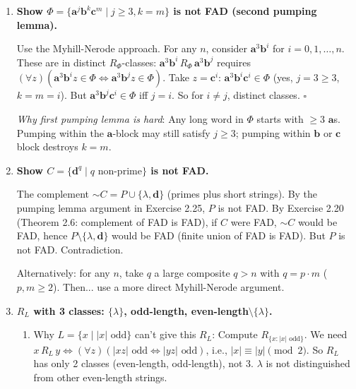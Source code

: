 \begin{enumerate}[{2.}1.]
\item \textbf{Show $\Phi=\{\mathbf{a}^j\mathbf{b}^k\mathbf{c}^m\mid j\geq 3,k=m\}$ is not FAD (second pumping lemma).}

Use the Myhill-Nerode approach. For any $n$, consider $\mathbf{a}^3\mathbf{b}^i$ for $i=0,1,\ldots,n$. These are in distinct $R_\Phi$-classes: $\mathbf{a}^3\mathbf{b}^i\,R_\Phi\,\mathbf{a}^3\mathbf{b}^j$ requires $(\forall z)(\mathbf{a}^3\mathbf{b}^iz\in\Phi\Leftrightarrow\mathbf{a}^3\mathbf{b}^jz\in\Phi)$. Take $z=\mathbf{c}^i$: $\mathbf{a}^3\mathbf{b}^i\mathbf{c}^i\in\Phi$ (yes, $j=3\geq 3$, $k=m=i$). But $\mathbf{a}^3\mathbf{b}^j\mathbf{c}^i\in\Phi$ iff $j=i$. So for $i\neq j$, distinct classes. $\square$

\textit{Why first pumping lemma is hard}: Any long word in $\Phi$ starts with $\geq 3$ $\mathbf{a}$s. Pumping within the $\mathbf{a}$-block may still satisfy $j\geq 3$; pumping within $\mathbf{b}$ or $\mathbf{c}$ block destroys $k=m$.

\item \textbf{Show $C=\{\mathbf{d}^q\mid q\text{ non-prime}\}$ is not FAD.}

The complement $\sim C=P\cup\{\lambda,\mathbf{d}\}$ (primes plus short strings). By the pumping lemma argument in Exercise 2.25, $P$ is not FAD. By Exercise 2.20 (Theorem 2.6: complement of FAD is FAD), if $C$ were FAD, $\sim C$ would be FAD, hence $P\setminus\{\lambda,\mathbf{d}\}$ would be FAD (finite union of FAD is FAD). But $P$ is not FAD. Contradiction.

Alternatively: for any $n$, take $q$ a large composite $q>n$ with $q=p\cdot m$ ($p,m\geq 2$). Then... use a more direct Myhill-Nerode argument.

\item \textbf{$R_L$ with 3 classes: $\{\lambda\}$, odd-length, even-length$\setminus\{\lambda\}$.}

\begin{enumerate}
\item Why $L=\{x\mid|x|\text{ odd}\}$ can't give this $R_L$: Compute $R_{\{x:|x|\text{ odd}\}}$. We need $x\,R_L\,y\Leftrightarrow(\forall z)(|xz|\text{ odd}\Leftrightarrow|yz|\text{ odd})$, i.e., $|x|\equiv|y|\pmod 2$. So $R_L$ has only 2 classes (even-length, odd-length), not 3. $\lambda$ is not distinguished from other even-length strings.


\end{enumerate}
\end{enumerate}
